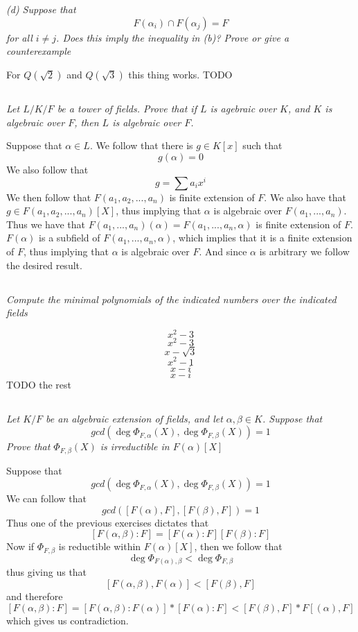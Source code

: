 \documentclass[11pt,oneside,titlepage]{book}
\begin{document}
\textit{(d) Suppose that
  $$F(\alpha_i) \cap F(\alpha_j) = F$$
  for all $i \neq j$. Does this imply the inequality in (b)? Prove or give a counterexample
}

For $Q(\sqrt{2})$ and $Q(\sqrt{3})$ this thing works. TODO


\subsection{}

\textit{Let $L/K/F$ be a tower of fields. Prove that if $L$ is agebraic over $K$,
  and $K$ is algebraic over $F$, then $L$ is algebraic over $F$.}

Suppose that $\alpha \in L$.
We follow that there is $g \in K[x]$ such that
$$g(\alpha) = 0$$
We also follow that
$$g = \sum{a_i x^i}$$
We then follow that $F(a_1, a_2, ..., a_n)$ is finite extension of
$F$.  We also have that $g \in F(a_1, a_2, ..., a_n)[X]$, thus
implying that $\alpha$ is algebraic over $F(a_1, ..., a_n)$. Thus we
have that $F(a_1, ..., a_n)(\alpha) = F(a_1, ..., a_n, \alpha)$ is
finite extension of $F$. $F(\alpha)$ is a subfield of $F(a_1, ...,
a_n, \alpha)$, which implies that it is a finite extension of $F$,
thus implying that $\alpha$ is algebraic over $F$. And since $\alpha$
is arbitrary we follow the desired result. 

\subsection{}

\textit{Compute the minimal polynomials of the indicated numbers over
  the indicated fields}

$$x^2 - 3$$
$$x^2 - 3$$
$$x - \sqrt{3}$$
$$x^2 - 1$$
$$x - i$$
$$x - i$$
TODO the rest


\subsection{}

\textit{Let $K/F$ be an algebraic extension of fields, and let
  $\alpha, \beta \in K$. Suppose that
  $$gcd(\deg\Phi_{F, \alpha}(X), \deg\Phi_{F, \beta}(X)) = 1$$
  Prove that $\Phi_{F, \beta}(X)$ is irreductible in $F(\alpha)[X]$}

Suppose that
$$gcd(\deg\Phi_{F, \alpha}(X), \deg\Phi_{F, \beta}(X)) = 1$$
We can follow that
$$gcd([F(\alpha), F], [F(\beta), F]) = 1$$
Thus one of the previous exercises dictates that
$$[F(\alpha, \beta): F] = [F(\alpha): F][F(\beta): F]$$
Now if $\Phi_{F, \beta}$ is reductible within $F(\alpha)[X]$,
then we follow that
$$ \deg \Phi_{F(\alpha), \beta} < \deg \Phi_{F, \beta} $$
thus giving us that
$$ [F(\alpha, \beta), F(\alpha)] < [F(\beta), F] $$
and therefore
$$ [F(\alpha, \beta) : F] =
[F(\alpha, \beta) : F(\alpha)] * [F(\alpha) : F]
< [F(\beta), F] * F[(\alpha), F] $$
which gives us contradiction.
\end{document}
